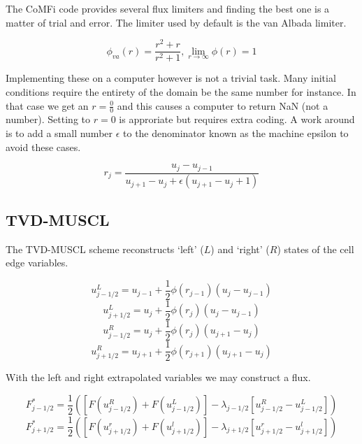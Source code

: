 \documentclass[12pt,upcase]{umlthesis}
\begin{document}
The CoMFi code provides several flux limiters and finding the best one is a matter of trial and error. The limiter used by default is the van Albada limiter.

\begin{equation}\label{eq:vanalbada}
	\phi_{va}(r) = \frac{r^2 + r}{r^2 + 1}, \lim_{r \to \infty} \phi(r) = 1
\end{equation}

Implementing these on a computer however is not a trivial task. Many initial conditions require the entirety of the domain be the same number for instance. In that case we get an $r = \frac{0}{0}$ and this causes a computer to return NaN (not a number). Setting to $r=0$ is approriate but requires extra coding. A work around is to add a small number $\epsilon$ to the denominator known as the machine epsilon to avoid these cases.

\begin{equation}
	r_j = \frac{u_j - u_{j-1}}{u_{j+1} - u_j + \epsilon(u_{j+1} - u_j + 1)}
\end{equation}

\subsection{TVD-MUSCL}

The TVD-MUSCL scheme reconstructs `left' ($L$) and `right' ($R$) states of the cell edge variables. 

\begin{equation}
	u^L_{j-1/2} = u_{j-1} + \frac{1}{2} \phi(r_{j-1}) (u_j - u_{j-1})
\end{equation}
\begin{equation}
	u^L_{j+1/2} = u_{j} + \frac{1}{2} \phi(r_{j}) (u_j - u_{j-1})
\end{equation}
\begin{equation}
	u^R_{j-1/2} = u_{j} + \frac{1}{2} \phi(r_{j}) (u_{j+1} - u_{j})
\end{equation}
\begin{equation}
	u^R_{j+1/2} = u_{j+1} + \frac{1}{2} \phi(r_{j+1}) (u_{j+1} - u_{j})
\end{equation}

With the left and right extrapolated variables we may construct a flux.

\begin{equation}
	F^*_{j-1/2} = \frac{1}{2} ([F(u^R_{j-1/2})+F(u^L_{j-1/2})] - \lambda_{j-1/2}[u^R_{j-1/2}-u^L_{j-1/2}])
\end{equation}
\begin{equation}
	F^*_{j+1/2} = \frac{1}{2} ([F(u^r_{j+1/2})+F(u^l_{j+1/2})] - \lambda_{j+1/2}[u^r_{j+1/2}-u^l_{j+1/2}])
\end{equation}
\end{document}
